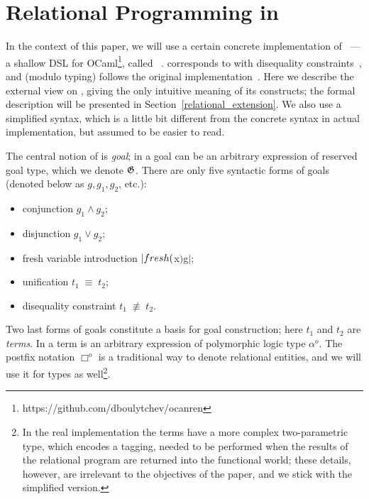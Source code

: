 \section{Relational Programming in \miniKanren}
\label{ocanren}

In the context of this paper, we will use a certain concrete implementation of \miniKanren~--- a shallow DSL for 
OCaml\footnote{https://github.com/dboulytchev/ocanren}, called \ocanren~\cite{ocanren}. \ocanren corresponds to \miniKanren with
disequality constraints~\cite{CKanren}, and (modulo typing) follows the original implementation~\cite{MicroKanren,SmallEmbedding}. Here we describe the external view 
on \ocanren, giving the only intuitive meaning of its constructs; the formal description will be presented in Section~\ref{relational_extension}.
We also use a simplified syntax, which is a little bit different from the concrete syntax in actual implementation, but assumed to
be easier to read.

The central notion of \miniKanren is \emph{goal}; in \ocanren a goal can be an arbitrary expression of reserved goal type, which we denote $\mathfrak G$.
There are only five syntactic forms of goals (denoted below as $g, g_1, g_2$, etc.):

\begin{itemize}
  \item conjunction $g_1\wedge g_2$;
  \item disjunction $g_1\vee g_2$;
  \item fresh variable introduction $\lstinline|fresh ($x$) $\;g$|$;
  \item unification $t_1\;\equiv\;t_2$;
  \item disequality constraint $t_1\;\not\equiv\;t_2$.
\end{itemize}

Two last forms of goals constitute a basis for goal construction; here $t_1$ and $t_2$ are \emph{terms}. In \ocanren a term is an arbitrary expression of polymorphic logic type $\alpha^o$. The postfix notation $\Box^o$ is a traditional way to denote relational entities, and we will use it for types as well\footnote{In the real implementation the terms have a more complex two-parametric type, which encodes a tagging, needed to be performed when the results of the relational program are returned into the functional world; these details, however, are irrelevant to the objectives of the paper, and we stick with the simplified version.}.

